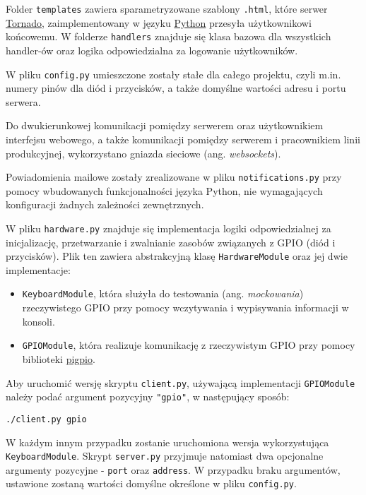 \documentclass{article}
\begin{document}
Folder \texttt{templates} zawiera sparametryzowane szablony \texttt{.html}, które serwer \href{https://www.tornadoweb.org/en/stable/}{Tornado}, zaimplementowany w języku \href{https://www.python.org/}{Python} przesyła użytkownikowi końcowemu. W folderze \texttt{handlers} znajduje się klasa bazowa dla wszystkich handler-ów oraz logika odpowiedzialna za logowanie użytkowników.

W pliku \texttt{config.py} umieszczone zostały stałe dla całego projektu, czyli m.in. numery pinów dla diód i przycisków, a także domyślne wartości adresu i portu serwera.

Do dwukierunkowej komunikacji pomiędzy serwerem oraz użytkownikiem interfejsu webowego, a także komunikacji pomiędzy serwerem i pracownikiem linii produkcyjnej, wykorzystano gniazda sieciowe (ang. \textit{websockets}).

Powiadomienia mailowe zostały zrealizowane w pliku \texttt{notifications.py} przy pomocy wbudowanych funkcjonalności języka Python, nie wymagających konfiguracji żadnych zależności zewnętrznych.

W pliku \texttt{hardware.py} znajduje się implementacja logiki odpowiedzialnej za inicjalizację, przetwarzanie i zwalnianie zasobów związanych z GPIO (diód i przycisków). Plik ten zawiera abstrakcyjną klasę \texttt{HardwareModule} oraz jej dwie implementacje:

\begin{itemize}
    \item \texttt{KeyboardModule}, która służyła do testowania (ang. \textit{mockowania}) rzeczywistego GPIO przy pomocy wczytywania i wypisywania informacji w konsoli.
    \item \texttt{GPIOModule}, która realizuje komunikację z rzeczywistym GPIO przy pomocy biblioteki \href{https://github.com/joan2937/pigpio}{pigpio}.
\end{itemize}

Aby uruchomić wersję skryptu \texttt{client.py}, używającą implementacji \texttt{GPIOModule} należy podać argument pozycyjny \texttt{"gpio"}, w następujący sposób:

\begin{verbatim}
./client.py gpio
\end{verbatim}

W każdym innym przypadku zostanie uruchomiona wersja wykorzystująca \texttt{KeyboardModule}. Skrypt \texttt{server.py} przyjmuje natomiast dwa opcjonalne argumenty pozycyjne - \texttt{port} oraz \texttt{address}. W przypadku braku argumentów, ustawione zostaną wartości domyślne określone w pliku \texttt{config.py}. 
\end{document}
